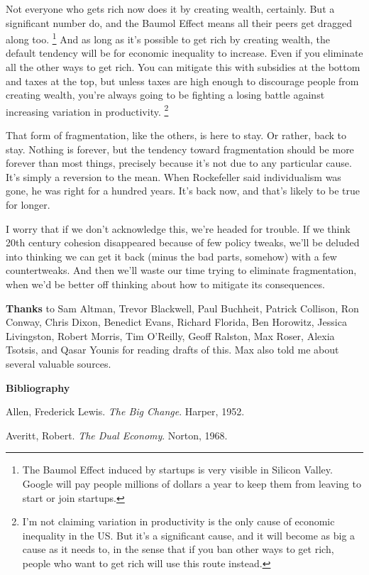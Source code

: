 Not everyone who gets rich now does it by creating wealth, certainly.
But a significant number do, and the Baumol Effect means all their peers
get dragged along too. \footnote{The Baumol Effect induced by startups is very visible in
Silicon Valley. Google will pay people millions of dollars a year to
keep them from leaving to start or join startups.} And as long as it's
possible to get rich by creating wealth, the default tendency will be
for economic inequality to increase. Even if you eliminate all the other
ways to get rich. You can mitigate this with subsidies at the bottom and
taxes at the top, but unless taxes are high enough to discourage people
from creating wealth, you're always going to be fighting a losing battle
against increasing variation in productivity. \footnote{I'm not claiming variation in productivity is the only cause of
economic inequality in the US. But it's a significant cause, and it will
become as big a cause as it needs to, in the sense that if you ban other
ways to get rich, people who want to get rich will use this route
instead.}

That form of fragmentation, like the others, is here to stay. Or rather,
back to stay. Nothing is forever, but the tendency toward fragmentation
should be more forever than most things, precisely because it's not due
to any particular cause. It's simply a reversion to the mean. When
Rockefeller said individualism was gone, he was right for a hundred
years. It's back now, and that's likely to be true for longer.

I worry that if we don't acknowledge this, we're headed for trouble. If
we think 20th century cohesion disappeared because of few policy tweaks,
we'll be deluded into thinking we can get it back (minus the bad parts,
somehow) with a few countertweaks. And then we'll waste our time trying
to eliminate fragmentation, when we'd be better off thinking about how
to mitigate its consequences.


\textbf{Thanks} to Sam Altman, Trevor Blackwell, Paul Buchheit, Patrick
Collison, Ron Conway, Chris Dixon, Benedict Evans, Richard Florida, Ben
Horowitz, Jessica Livingston, Robert Morris, Tim O'Reilly, Geoff
Ralston, Max Roser, Alexia Tsotsis, and Qasar Younis for reading drafts
of this. Max also told me about several valuable sources.

\textbf{Bibliography}

Allen, Frederick Lewis. \emph{The Big Change}. Harper, 1952.

Averitt, Robert. \emph{The Dual Economy}. Norton, 1968.

